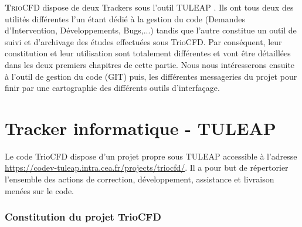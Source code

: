 
\lettrine[lines=2,slope=0pt,nindent=4pt]{\textbf{T}}{rioCFD} dispose de deux Trackers sous l'outil TULEAP \cite{TULEAP}. Ils ont tous deux des utilit\'es diff\'erentes
l'un \'etant d\'edi\'e \`a la gestion du code (Demandes d'Intervention, D\'eveloppements, Bugs,...) tandis que l'autre constitue un outil de suivi et d'archivage des \'etudes effectu\'ees sous TrioCFD. Par cons\'equent, leur constitution et leur utilisation sont totalement diff\'erentes et vont \^etre d\'etaill\'ees dans les deux premiers chapitres de cette partie. Nous nous int\'eresserons ensuite \`a l'outil de gestion du code (GIT) puis, les diff\'erentes messageries du projet pour finir par une cartographie des diff\'erents outils d'interfa\c cage.

\chapter{\label{chapitre:tracker-info}Tracker informatique - TULEAP}

Le code TrioCFD dispose d'un projet propre sous TULEAP accessible à l'adresse \url{https://codev-tuleap.intra.cea.fr/projects/triocfd/}.
Il a pour but de r\'epertorier l'ensemble des actions de correction, d\'eveloppement, assistance et livraison men\'ees sur le code.

\subsection{Constitution du projet TrioCFD}

